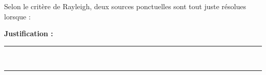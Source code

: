 Selon le critère de Rayleigh, deux sources ponctuelles sont tout juste résolues lorsque :

\choices

\noindent\textbf{Justification :} \hrulefill \\[2.5ex]
\rule{\linewidth}{0.4pt} \\[2.5ex]
\rule{\linewidth}{0.4pt}
\vfill
